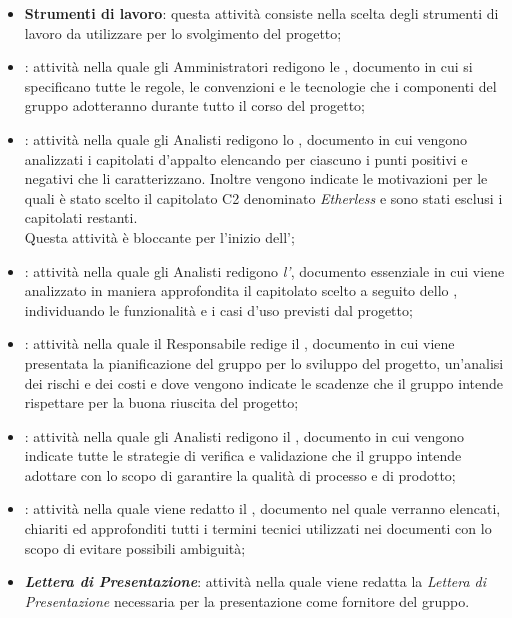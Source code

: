 \begin{itemize}
	\item \textbf{Strumenti di lavoro}: questa attività consiste nella scelta degli strumenti di lavoro da utilizzare per lo svolgimento del progetto;
	\item \textbf{\textit{\NdP{}}}: attività nella quale gli Amministratori redigono le \textit{\NdP{}}, documento in cui si specificano tutte le regole, le convenzioni e le tecnologie che i componenti del gruppo adotteranno durante tutto il corso del progetto;
	\item \textbf{\textit{\SdF{}}}: attività nella quale gli Analisti redigono lo \textit{\SdF}, documento in cui vengono analizzati i capitolati d'appalto elencando per ciascuno i punti positivi e negativi che li caratterizzano. Inoltre vengono indicate le motivazioni per le quali è stato scelto il capitolato C2 denominato \textit{Etherless} e sono stati esclusi i capitolati restanti. \\
	Questa attività è bloccante per l'inizio dell'\textit{\AdR{}};
	\item \textbf{\textit{\AdR{}}}: attività nella quale gli Analisti redigono \textit{l'\AdR}, documento essenziale in cui viene analizzato in maniera approfondita il capitolato scelto a seguito dello \textit{\SdF{}}, individuando le funzionalità e i casi d'uso previsti dal progetto;
	\item \textbf{\textit{\PdP{}}}: attività nella quale il Responsabile redige il \textit{\PdP}, documento in cui viene presentata la pianificazione del gruppo per lo sviluppo del progetto, un'analisi dei rischi e dei costi e dove vengono indicate le scadenze che il gruppo intende rispettare per la buona riuscita del progetto;
	\item \textbf{\textit{\PdQ{}}}: attività nella quale gli Analisti redigono il \textit{\PdQ}, documento in cui vengono indicate tutte le strategie di verifica e validazione che il gruppo intende adottare con lo scopo di garantire la qualità di processo e di prodotto;
	\item \textbf{\textit{\Glossario{}}}: attività nella quale viene redatto il \textit{\Glossario}, documento nel quale verranno elencati, chiariti ed approfonditi tutti i termini tecnici utilizzati nei documenti con lo scopo di evitare possibili ambiguità;
	\item \textbf{\textit{Lettera di Presentazione}}: attività nella quale viene redatta la \textit{Lettera di Presentazione} necessaria per la presentazione come fornitore del gruppo.
\end{itemize}

